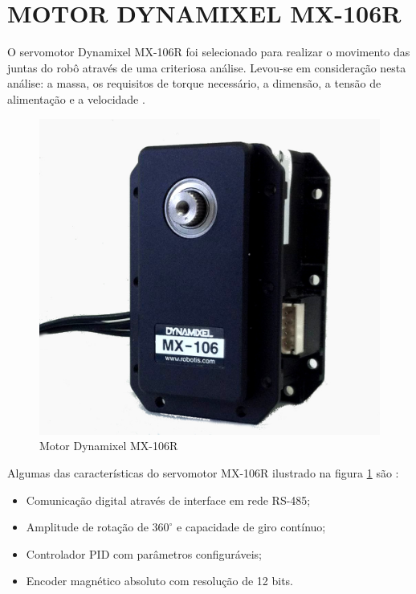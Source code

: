 \documentclass[12pt,oneside,a4paper, chapter=TITLE, section = TITLE, english, brazil]{abntex2}
\begin{document}
\section{MOTOR DYNAMIXEL MX-106R} \label{sec:mot_dyn} %

O servomotor Dynamixel MX-106R foi selecionado para realizar o movimento das juntas do robô através de uma criteriosa análise. Levou-se em consideração nesta análise: a massa, os requisitos de torque necessário, a dimensão, a tensão de alimentação e a velocidade \cite{cemig}.

\begin{figure}[h] %
\centering
\includegraphics[scale=0.32]{./imagens/MX-106R}
\caption[Motor Dynamixel MX-106R]{Motor Dynamixel MX-106R}
\label{fig:mx-106r}
\end{figure}

Algumas das características do servomotor MX-106R ilustrado na figura \ref{fig:mx-106r} são \cite{cemig}:

\begin{itemize}

\item Comunicação digital através de interface em rede RS-485;

\item Amplitude de rotação de $360^\circ$ e capacidade de giro contínuo;

\item Controlador PID com parâmetros configuráveis;

\item Encoder magnético absoluto com resolução de 12 bits.

\end{itemize}
\end{document}
